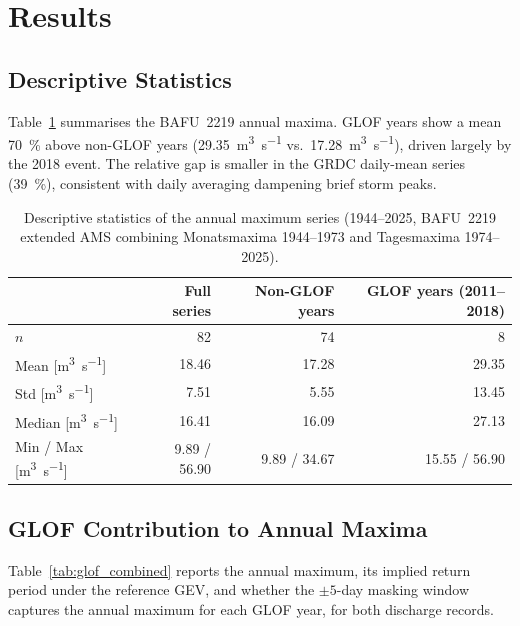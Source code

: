 \section{Results}
\label{sec:results}

\subsection{Descriptive Statistics}
\label{sec:results:desc}

Table~\ref{tab:desc_stats} summarises the BAFU~2219 annual maxima. GLOF years show a
mean \SI{70}{\percent} above non-GLOF years (\SI{29.35}{m^3\per s}
vs.\ \SI{17.28}{m^3\per s}), driven largely by the 2018 event. The relative gap is
smaller in the GRDC daily-mean series (\SI{39}{\percent}), consistent with daily
averaging dampening brief storm peaks.

\begin{table}[H]
  \centering
  \caption{Descriptive statistics of the annual maximum series (1944--2025, BAFU~2219
           extended AMS combining Monatsmaxima 1944--1973 and Tagesmaxima 1974--2025).}
  \label{tab:desc_stats}
  \begin{tabular}{lrrr}
    \toprule
    & Full series & Non-GLOF years & GLOF years (2011--2018) \\
    \midrule
    $n$                        & 82   & 74   & 8    \\
    Mean [\si{m^3\per s}]      & 18.46 & 17.28 & 29.35 \\
    Std  [\si{m^3\per s}]      &  7.51 &  5.55 & 13.45 \\
    Median [\si{m^3\per s}]    & 16.41 & 16.09 & 27.13 \\
    Min / Max [\si{m^3\per s}] & 9.89 / 56.90 & 9.89 / 34.67 & 15.55 / 56.90 \\
    \bottomrule
  \end{tabular}
\end{table}

\subsection{GLOF Contribution to Annual Maxima}
\label{sec:results:glof_contribution}

Table~\ref{tab:glof_combined} reports the annual maximum, its implied return period under
the reference GEV, and whether the $\pm 5$-day masking window captures the annual maximum
for each GLOF year, for both discharge records.

